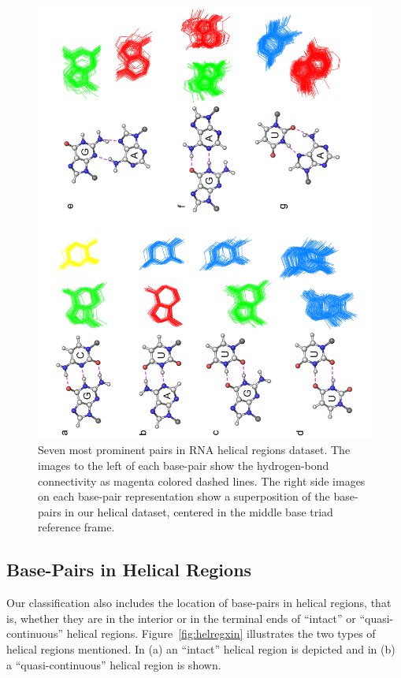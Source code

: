 \begin{figure}[htbp]
\centering
\includegraphics[angle=-90, scale=0.6]{Chapter3/sevenpairs.png}
\caption{Seven   most   prominent  pairs   in   RNA  helical   regions
  dataset.  The  images  to  the  left  of  each  base-pair  show  the
  hydrogen-bond  connectivity  as magenta  colored  dashed lines.  The
  right  side   images  on   each  base-pair  representation   show  a
  superposition of the base-pairs  in our helical dataset, centered in
  the middle base triad reference frame. }
\label{fig:pairs}
\end{figure}

\subsection{Base-Pairs in Helical Regions}
Our classification also includes the location of base-pairs in helical
regions, that is, whether they are  in the interior or in the terminal
ends     of     ``intact''     or     ``quasi-continuous''     helical
regions.  Figure~\ref{fig:helregxin}  illustrates  the  two  types  of
helical regions  mentioned. In (a) an  ``intact'' helical region
is depicted and in (b) a ``quasi-continuous'' helical region is shown.

